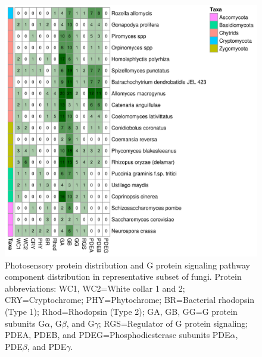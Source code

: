 
\begin{figure}[htbp]
  \includegraphics[]{./Chapter_RhodAux/img/photosenseHeatmap.png}
  \caption[Photosensory survey]{Photosensory protein distribution and G protein signaling pathway component distribution in representative subset of fungi. Protein abbreviations: WC1, WC2=White collar 1 and 2; CRY=Cryptochrome; PHY=Phytochrome; BR=Bacterial rhodopsin (Type 1); Rhod=Rhodopsin (Type 2); GA, GB, GG=G protein subunits G$\alpha$, G$\beta$, and G$\gamma$; RGS=Regulator of G protein signaling; PDEA, PDEB, and PDEG=Phosphodiesterase subunits PDE$\alpha$, PDE$\beta$, and PDE$\gamma$.}
  \label{fig:ChRhodA_photosenseSurvey}
\end{figure}

